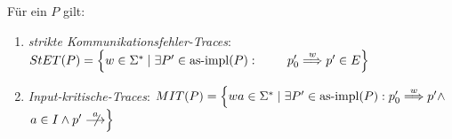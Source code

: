 \begin{Prop}
  Für ein \MEIO{} $P$ gilt:
  \begin{enumerate}
    \item \emph{strikte Kommunikationsfehler-Traces}: $\StET (P) =
      \left\{w\in\Sigma ^* \mid \exists P' \in\asimp (P) :
      \phantom{\weakmust[w]} \right.$ $\left. p'_0 \weakmust[w] p' \in
      E\right\}$ 
    \item \emph{Input-kritische-Traces}: $\MIT (P) = \left\{wa\in\Sigma ^* \mid
      \exists P' \in\asimp (P) : p'_0 \weakmust[w] p' \land \right.$\linebreak
      $\left. a\in I\land p'\nmust[a] \right\}$ 
  \end{enumerate}
\end{Prop}
